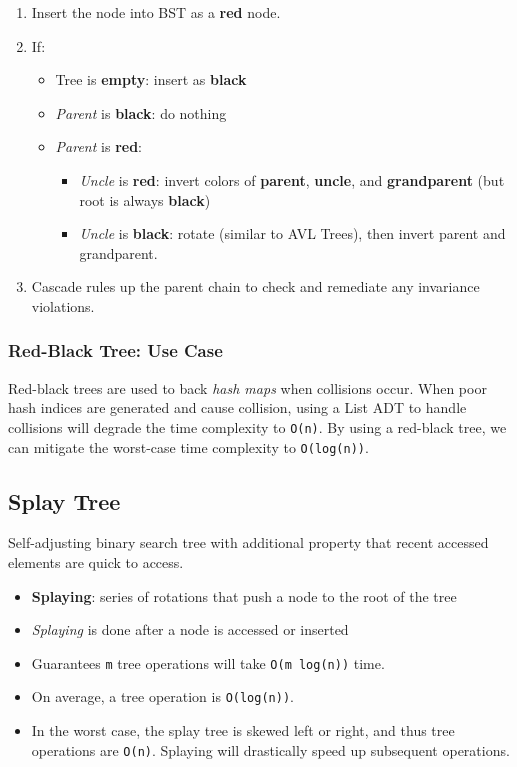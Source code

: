 \documentclass[12pt, letterpaper]{article}
\begin{document}
\begin{enumerate}
    \item Insert the node into BST as a \textbf{red} node.
    \item If:
        \begin{itemize}
            \item Tree is \textbf{empty}: insert as \textbf{black}
            \item \textit{Parent} is \textbf{black}: do nothing
            \item \textit{Parent} is \textbf{red}:
                \begin{itemize}
                    \item \textit{Uncle} is \textbf{red}: invert colors of \textbf{parent}, \textbf{uncle}, and \textbf{grandparent} (but root is always \textbf{black})
                    \item \textit{Uncle} is \textbf{black}: rotate (similar to AVL Trees), then invert parent and grandparent.
                \end{itemize}
        \end{itemize}
    \item Cascade rules up the parent chain to check and remediate any invariance violations.
\end{enumerate}

\subsubsection*{Red-Black Tree: Use Case}

Red-black trees are used to back \textit{hash maps} when collisions occur. When poor hash indices are generated and cause collision, using a List ADT to handle collisions will degrade the time complexity to \texttt{O(n)}. By using a red-black tree, we can mitigate the worst-case time complexity to \texttt{O(log(n))}.

\subsection*{Splay Tree}

Self-adjusting binary search tree with additional property that recent accessed elements are quick to access.

\begin{itemize}
    \item \textbf{Splaying}: series of rotations that push a node to the root of the tree
    \item \textit{Splaying} is done after a node is accessed or inserted
    \item Guarantees \texttt{m} tree operations will take \texttt{O(m log(n))} time.
    \item On average, a tree operation is \texttt{O(log(n))}.
    \item In the worst case, the splay tree is skewed left or right, and thus tree operations are \texttt{O(n)}. Splaying will drastically speed up subsequent operations.
\end{itemize}
\end{document}
